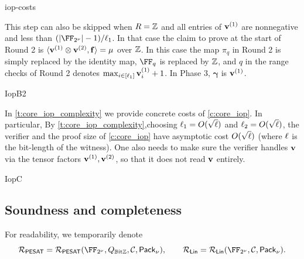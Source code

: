 \begin{lncsappendix}{iop-costs}
\iflncs
\begin{remark}[Skipping Round 1 when $R=\ZZ$ and $\lVert \vv\rVert_{\infty}$ is ``small'']\label{r:skip_round_1_integers}
    This step can also be skipped when $R=\ZZ$ and all entries of $\mathbf{v}^{(1)}$ are nonnegative and less than $\fieldboundsizeexponent$. In that case the claim to prove at the start of Round 2 is $\langle \mathbf{v}^{(1)} \otimes \mathbf{v}^{(2)}, \mathbf{f}\rangle = \mu $ over $\mathbb{Z}$. In this case the map $\pi_q$ in Round 2 is simply replaced by the identity map, $\FF_q$ is replaced by $\mathbb{Z}$, and $q$ in the range checks of Round 2 denotes $\max_{i\in [\ell_1]} \mathbf{v}^{(1)}_i+1$. In Phase 3, $\bm{\gamma}$ is  $\mathbf{v}^{(1)}$. 
\end{remark}
\fi
\begin{lncsmove}{IopB2}
\begin{remark}\label{r:succinct_verifier}
   \iflncs In \cref{t:core_iop_complexity} we provide concrete costs of \cref{c:core_iop}. In particular, \else By \cref{t:core_iop_complexity},\fi choosing $\ell_1 =O(\sqrt{\ell})$ and $\ell_2 =O(\sqrt{\ell})$, the verifier and the proof size of \cref{c:core_iop} have asymptotic cost $O(\sqrt{\ell})$ (where $\ell$ is the bit-length of the witness). One also needs to make sure the verifier handles $\mathbf{v}$ via the tensor factors $\mathbf{v}^{(1)}, \mathbf{v}^{(2)}$, so that it does not read $\mathbf{v}$ entirely.
\end{remark}
\end{lncsmove}



\begin{lncsmove}{IopC}
\subsection{Soundness and completeness}\label{s:soundness_core_iop}


For readability, we temporarily denote $$\PESAT=\PESAT(\comfield, Q_{\mathbb{B}\text{it}\ZZ},\cC, \pack),\qquad \LIN = \LIN(\comfield, \cC, \pack).$$





\end{lncsmove}
\end{lncsappendix}
